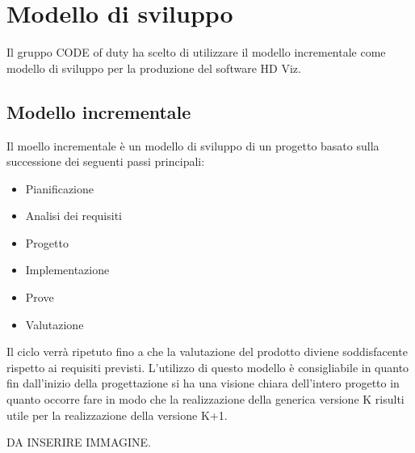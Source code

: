 \section{Modello di sviluppo}
Il gruppo CODE of duty ha scelto di utilizzare il modello incrementale come modello di sviluppo per la produzione del software HD Viz.
\subsection{Modello incrementale}
Il moello incrementale è un modello di sviluppo di un progetto basato sulla successione dei seguenti passi principali:
\begin{itemize}
	\item Pianificazione
	\item Analisi dei requisiti
	\item Progetto
	\item Implementazione
	\item Prove
	\item Valutazione
\end{itemize}
Il ciclo verrà ripetuto fino a che la valutazione del prodotto diviene soddisfacente rispetto ai requisiti previsti.
L'utilizzo di questo modello è consigliabile in quanto fin dall'inizio della progettazione si ha una visione chiara dell'intero progetto in quanto occorre fare in modo che la realizzazione della generica versione K risulti utile per la realizzazione della versione K+1.

DA INSERIRE IMMAGINE.
